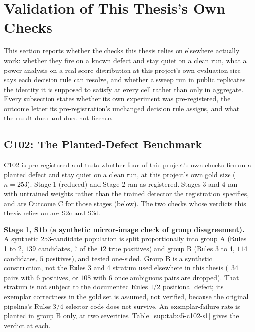 %

\section{Validation of This Thesis's Own Checks}
\label{sup:s5}

This section reports whether the checks this thesis relies on elsewhere
actually work: whether they fire on a known defect and stay quiet on a clean
run, what a power analysis on a real score distribution at this project's
own evaluation size says each decision rule can resolve, and whether a
sweep run in public replicates the identity it is supposed to satisfy at
every cell rather than only in aggregate. Every subsection states whether its
own experiment was pre-registered, the outcome letter its pre-registration's
unchanged decision rule assigns, and what the result does and does not
license.

\subsection{C102: The Planted-Defect Benchmark}
\label{sup:sec:s5-c102}

C102 is pre-registered and tests whether four of this project's own checks fire on a planted defect
and stay quiet on a clean run, at this project's own gold size ($n=253$).
Stage 1 (reduced) and Stage 2 ran as registered. Stages 3 and 4 ran with
untrained weights rather than the trained detector the registration
specifies, and are Outcome C for those stages (below). The two checks whose
verdicts this thesis relies on are S2c and S3d.

\textbf{Stage 1, S1b (a synthetic mirror-image check of group disagreement).} A synthetic
$253$-candidate population is split proportionally into group A (Rules 1 to 2, $139$ candidates,
$7$ of the $12$ true positives) and group B (Rules 3 to 4, $114$ candidates, $5$ positives), and
tested one-sided. Group B is a synthetic construction, not the Rules 3 and 4 stratum used elsewhere in
this thesis ($134$ pairs with $6$ positives, or $108$ with $6$ once ambiguous pairs are dropped). That
stratum is not subject to the documented Rules 1/2 positional defect; its exemplar correctness in the
gold set is assumed, not verified, because the original pipeline's Rules 3/4 selector code does not survive.
An exemplar-failure rate is planted in group B only, at two severities. Table~\ref{sup:tab:s5-c102-s1}
gives the verdict at each.

